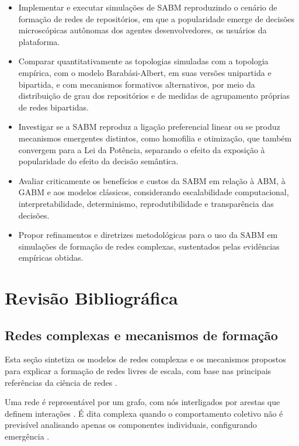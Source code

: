 \documentclass[12pt,oneside,a4paper,brazil,sumario=tradicional]{abntex2}
\begin{document}
\begin{itemize}
  \item Implementar e executar simulações de SABM reproduzindo o cenário de formação de redes de repositórios, em que a popularidade emerge de decisões microscópicas autônomas dos agentes desenvolvedores, os usuários da plataforma.
  \item Comparar quantitativamente as topologias simuladas com a topologia empírica, com o modelo Barabási-Albert, em suas versões unipartida e bipartida, e com mecanismos formativos alternativos, por meio da distribuição de grau dos repositórios e de medidas de agrupamento próprias de redes bipartidas.
  \item Investigar se a SABM reproduz a ligação preferencial linear ou se produz mecanismos emergentes distintos, como homofilia e otimização, que também convergem para a Lei da Potência, separando o efeito da exposição à popularidade do efeito da decisão semântica.
  \item Avaliar criticamente os benefícios e custos da SABM em relação à ABM, à GABM e aos modelos clássicos, considerando escalabilidade computacional, interpretabilidade, determinismo, reprodutibilidade e transparência das decisões.
  \item Propor refinamentos e diretrizes metodológicas para o uso da SABM em simulações de formação de redes complexas, sustentados pelas evidências empíricas obtidas.
\end{itemize}

\section{Revisão Bibliográfica}

\subsection{Redes complexas e mecanismos de formação}

Esta seção sintetiza os modelos de redes complexas e os mecanismos propostos para explicar a formação de redes livres de escala, com base nas principais referências da ciência de redes \parencite{barabasi2002, newman2010, latora2017}.

Uma rede é representável por um grafo, com nós interligados por arestas que definem interações \parencite{newman2003, wang2003}. É dita complexa quando o comportamento coletivo não é previsível analisando apenas os componentes individuais, configurando emergência \parencite{mata2020}.
\end{document}
